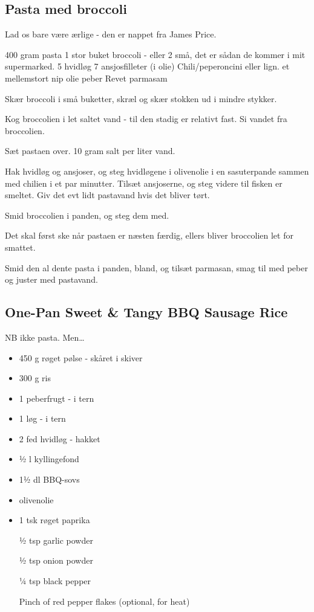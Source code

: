 \documentclass[
]{book}
\begin{document}
\subsection{Pasta med broccoli}\label{pasta-med-broccoli-1}

Lad os bare være ærlige - den er nappet fra James Price.

400 gram pasta
1 stor buket broccoli - eller 2 små, det er sådan de kommer i mit supermarked.
5 hvidløg
7 ansjosfilleter (i olie)
Chili/peperoncini eller lign. et mellemstort nip
olie
peber
Revet parmasam

Skær broccoli i små buketter, skræl og skær stokken ud i mindre stykker.

Kog broccolien i let saltet vand - til den stadig er relativt fast. Si vandet fra broccolien.

Sæt pastaen over. 10 gram salt per liter vand.

Hak hvidløg og ansjoser, og steg hvidløgene i olivenolie i en sasuterpande sammen med chilien i et par minutter. Tilsæt ansjoserne, og steg videre til fisken er smeltet. Giv det evt lidt pastavand hvis det bliver tørt.

Smid broccolien i panden, og steg dem med.

Det skal først ske når pastaen er næsten færdig, ellers bliver broccolien let for smattet.

Smid den al dente pasta i panden, bland, og tilsæt parmasan, smag til med peber og juster med pastavand.

\subsection{One-Pan Sweet \& Tangy BBQ Sausage Rice}\label{one-pan-sweet-tangy-bbq-sausage-rice}

NB ikke pasta. Men\ldots{}

\begin{itemize}
\item
  450 g røget pølse - skåret i skiver
\item
  300 g ris
\item
  1 peberfrugt - i tern
\item
  1 løg - i tern
\item
  2 fed hvidløg - hakket
\item
  ½ l kyllingefond
\item
  1½ dl BBQ-sovs
\item
  olivenolie
\item
  1 tsk røget paprika

  ½ tsp garlic powder

  ½ tsp onion powder

  ¼ tsp black pepper

  Pinch of red pepper flakes (optional, for heat)
\end{itemize}
\end{document}
